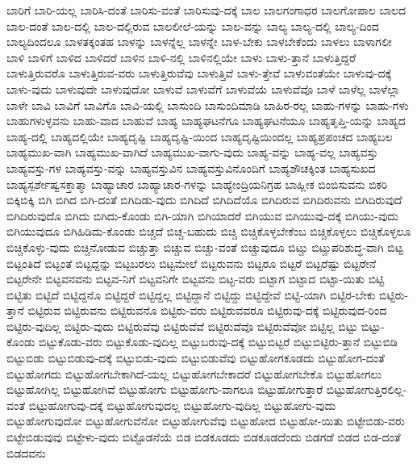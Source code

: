 {ಬಾರಿಗೆ
ಬಾರಿ-ಯಲ್ಲ
ಬಾರಿಸಿ-ದಂತೆ
ಬಾರಿಸು-ವಂತೆ
ಬಾರಿಸುವು-ದಕ್ಕೆ
ಬಾಲ
ಬಾಲಗಂಗಾಧರ
ಬಾಲಗೋಪಾಲ
ಬಾಲದ
ಬಾಲ-ದಂತೆ
ಬಾಲ-ದಲ್ಲಿ
ಬಾಲ-ದಲ್ಲಿರುವ
ಬಾಲಲೀಲೆ-ಯನ್ನು
ಬಾಲ-ವನ್ನು
ಬಾಲ್ಯ
ಬಾಲ್ಯ-ದಲ್ಲಿ
ಬಾಲ್ಯ-ದಿಂದ
ಬಾಲ್ಯದಿಂದಲೂ
ಬಾಳತಕ್ಕಂತಹ
ಬಾಳನ್ನು
ಬಾಳನ್ನೆಲ್ಲ
ಬಾಳನ್ನೇ
ಬಾಳ-ಬೇಕು
ಬಾಳಬೇಕೆಂದು
ಬಾಳಲು
ಬಾಳಾಗಲೀ
ಬಾಳಿ
ಬಾಳಿಗೆ
ಬಾಳಿದ
ಬಾಳಿದರೆ
ಬಾಳಿನ
ಬಾಳಿ-ನಲ್ಲಿ
ಬಾಳಿನಲ್ಲಿಯೇ
ಬಾಳು
ಬಾಳು-ತ್ತಾನೆ
ಬಾಳುತ್ತಿದ್ದರೆ
ಬಾಳುತ್ತಿರುವರೊ
ಬಾಳುತ್ತಿರುವ-ವರು
ಬಾಳುತ್ತಿರುವೆವು
ಬಾಳುತ್ತಿವೆ
ಬಾಳು-ತ್ತೇವೆ
ಬಾಳುವಂತೆಯೇ
ಬಾಳುವು-ದಕ್ಕೆ
ಬಾಳು-ವುದು
ಬಾಳುವುದೇ
ಬಾಳುವುದೋ
ಬಾಳುವೆ
ಬಾಳುವೆಗೆ
ಬಾಳುವೆಯೆ
ಬಾಳುವೆವೊ
ಬಾಳೆ
ಬಾಳೆಲ್ಲ
ಬಾಳೆಲ್ಲಾ
ಬಾಳೇ
ಬಾವಿ
ಬಾವಿಗೆ
ಬಾವಿಗೊ
ಬಾವಿ-ಯಲ್ಲಿ
ಬಾಸುಂದಿ
ಬಾಸುಂದಿಮಾಡಿ
ಬಾಹಿರ-ರಲ್ಲ
ಬಾಹು-ಗಳನ್ನು
ಬಾಹು-ಗಳು
ಬಾಹುಗಳುಳ್ಳವನು
ಬಾಹು-ವಾದ
ಬಾಹುವೆ
ಬಾಹ್ಯ
ಬಾಹ್ಯಘಟನೆಗೂ
ಬಾಹ್ಯಘಟನೆಯೂ
ಬಾಹ್ಯತೃಪ್ತಿ-ಯನ್ನು
ಬಾಹ್ಯದ
ಬಾಹ್ಯ-ದಲ್ಲಿ
ಬಾಹ್ಯದಲ್ಲಿಯೇ
ಬಾಹ್ಯದೃಷ್ಟಿ
ಬಾಹ್ಯದೃಷ್ಟಿ-ಯಿಂದ
ಬಾಹ್ಯದೃಷ್ಟಿಯಿಂದಲ್ಲ
ಬಾಹ್ಯಪ್ರಪಂಚದ
ಬಾಹ್ಯಬಲ
ಬಾಹ್ಯಮುಖ-ವಾಗಿ
ಬಾಹ್ಯಮುಖ-ವಾಗಿದೆ
ಬಾಹ್ಯಮುಖ-ವಾಗು-ವುದು
ಬಾಹ್ಯ-ವನ್ನು
ಬಾಹ್ಯ-ವಲ್ಲ
ಬಾಹ್ಯವಸ್ತು
ಬಾಹ್ಯವಸ್ತು-ಗಳ
ಬಾಹ್ಯವಸ್ತು-ವನ್ನು
ಬಾಹ್ಯವಸ್ತುವಿನ
ಬಾಹ್ಯವಸ್ತುವಿನೊಂದಿಗೆ
ಬಾಹ್ಯಶೌಚಕ್ಕಿಂತ
ಬಾಹ್ಯಸುಖದ
ಬಾಹ್ಯಸ್ಪರ್ಶೇಷ್ವಸಕ್ತಾತ್ಮಾ
ಬಾಹ್ಯಾಚಾರ
ಬಾಹ್ಯಾಚಾರ-ಗಳನ್ನು
ಬಾಹ್ಯೇಂದ್ರಿಯನಿಗ್ರಹ
ಬಾಹ್ಲೀಕ
ಬಿಂಬಿಸುವನು
ಬಿಕರಿ
ಬಿಕ್ಕಿಬಿಕ್ಕಿ
ಬಿಗಿ
ಬಿಗಿದ
ಬಿಗಿ-ದಂತೆ
ಬಿಗಿದಿಡು-ವುದು
ಬಿಗಿದಿದೆ
ಬಿಗಿದಿದೆಯೊ
ಬಿಗಿದಿರುವ
ಬಿಗಿದಿರುವನು
ಬಿಗಿದಿರುವುದೆ
ಬಿಗಿದಿರುವುದೊ
ಬಿಗಿದು
ಬಿಗಿದು-ಕೊಂಡು
ಬಿಗಿ-ಯಾಗಿ
ಬಿಗಿಯಾದರೆ
ಬಿಗಿಯುವ
ಬಿಗಿಯುವು-ದಕ್ಕೆ
ಬಿಗಿಯು-ವುದು
ಬಿಗಿಯುವುದೂ
ಬಿಗಿಹಿಡಿದು-ಕೊಂಡು
ಬಿಚ್ಚದೆ
ಬಿಚ್ಚ-ಬಹುದು
ಬಿಚ್ಚಿ
ಬಿಚ್ಚಿಕೊಳ್ಳಬೇಕೆಂಬ
ಬಿಚ್ಚಿಕೊಳ್ಳಲು
ಬಿಚ್ಚಿಕೊಳ್ಳಲೂ
ಬಿಚ್ಚಿಕೊಳ್ಳು-ವುದು
ಬಿಚ್ಚಿನೋಡುವ
ಬಿಚ್ಚುತ್ತಾ
ಬಿಚ್ಚುವ
ಬಿಚ್ಚು-ವಂತೆ
ಬಿಚ್ಚುವುದೂ
ಬಿಟ್ಚು
ಬಿಟ್ಚುಪರಿಶುದ್ಧ-ವಾಗಿ
ಬಿಟ್ಟ
ಬಿಟ್ಟಂತಿದೆ
ಬಿಟ್ಟಂತೆ
ಬಿಟ್ಟದ್ದನ್ನು
ಬಿಟ್ಟಬರಲು
ಬಿಟ್ಟಮೇಲೆ
ಬಿಟ್ಟರುವನು
ಬಿಟ್ಟರೂ
ಬಿಟ್ಟರೆ
ಬಿಟ್ಟರೆಷ್ಟು
ಬಿಟ್ಟರೇನೆ
ಬಿಟ್ಟರೇನೇ
ಬಿಟ್ಟವನವನು
ಬಿಟ್ಟವ-ನಿಗೆ
ಬಿಟ್ಟವನಿಗೇ
ಬಿಟ್ಟವನು
ಬಿಟ್ಟ-ವರು
ಬಿಟ್ಟಾಗ
ಬಿಟ್ಟಾದ
ಬಿಟ್ಟಾ-ಯಿತು
ಬಿಟ್ಟಿ
ಬಿಟ್ಟಿತು
ಬಿಟ್ಟಿದೆ
ಬಿಟ್ಟಿದ್ದನೊ
ಬಿಟ್ಟಿದ್ದರೆ
ಬಿಟ್ಟಿದ್ದಲ್ಲ
ಬಿಟ್ಟಿದ್ದಾನೆ
ಬಿಟ್ಟಿದ್ದು
ಬಿಟ್ಟಿದ್ದೇವೆ
ಬಿಟ್ಟಿ-ಯಾಗಿ
ಬಿಟ್ಟಿರ-ಬೇಕು
ಬಿಟ್ಟಿರು-ತ್ತಾನೆ
ಬಿಟ್ಟಿರುವ
ಬಿಟ್ಟಿರುವನು
ಬಿಟ್ಟಿರುವನೊ
ಬಿಟ್ಟಿರು-ವರು
ಬಿಟ್ಟಿರುವವರೂ
ಬಿಟ್ಟಿರುವು-ದಕ್ಕೆ
ಬಿಟ್ಟಿರುವುದ-ರಿಂದ
ಬಿಟ್ಟಿರು-ವುದಿಲ್ಲ
ಬಿಟ್ಟಿರು-ವುದು
ಬಿಟ್ಟಿರುವೆವು
ಬಿಟ್ಟಿರುವೆವೆ
ಬಿಟ್ಟಿರುವೆವೊ
ಬಿಟ್ಟಿರುವೆವೋ
ಬಿಟ್ಟಿಲ್ಲ
ಬಿಟ್ಟು
ಬಿಟ್ಟು-ಕೊಂಡು
ಬಿಟ್ಟುಕೊಡು-ವರು
ಬಿಟ್ಟುಕೊಡು-ವುದಿಲ್ಲ
ಬಿಟ್ಟುಬರುವು-ದಕ್ಕೆ
ಬಿಟ್ಟುಬಿಟ್ಟರೆ
ಬಿಟ್ಟುಬಿಟ್ಟಿರು-ತ್ತಾನೆ
ಬಿಟ್ಟುಬಿಡಿ
ಬಿಟ್ಟುಬಿಡು
ಬಿಟ್ಟುಬಿಡುವು-ದಕ್ಕೆ
ಬಿಟ್ಟುಬಿಡು-ವುದು
ಬಿಟ್ಟುಬಿಡುವೆವು
ಬಿಟ್ಟುಹೋಗಕೂಡದು
ಬಿಟ್ಟುಹೋಗ-ದಂತೆ
ಬಿಟ್ಟುಹೋಗದು
ಬಿಟ್ಟುಹೋಗಬೇಕಾಗಿದೆ-ಯಲ್ಲ
ಬಿಟ್ಟುಹೋಗಬೇಕಾದರೆ
ಬಿಟ್ಟುಹೋಗಬೇಕೊ
ಬಿಟ್ಟುಹೋಗಲು
ಬಿಟ್ಟುಹೋಗಿಲ್ಲ
ಬಿಟ್ಟುಹೋಗಿವೆ
ಬಿಟ್ಟುಹೋಗು
ಬಿಟ್ಟುಹೋಗು-ವಾಗಲೂ
ಬಿಟ್ಟುಹೋಗುತ್ತಾರೆ
ಬಿಟ್ಟುಹೋಗುತ್ತಿರಲಿಲ್ಲ-ವಂತೆ
ಬಿಟ್ಟುಹೋಗುವು-ದಕ್ಕೆ
ಬಿಟ್ಟುಹೋಗುವುದಲ್ಲ
ಬಿಟ್ಟುಹೋಗು-ವುದಿಲ್ಲ
ಬಿಟ್ಟುಹೋಗು-ವುದು
ಬಿಟ್ಟುಹೋಗುವುದೋ
ಬಿಟ್ಟುಹೋಗುವೆನೋ
ಬಿಟ್ಟುಹೋಗುವೆವು
ಬಿಟ್ಟುಹೋದ
ಬಿಟ್ಟುಹೋ-ಯಿತು
ಬಿಟ್ಟೇಬಿಡು-ವರು
ಬಿಟ್ಟೇಬಿಡುವುವು
ಬಿಟ್ಟೇಳು-ವುದು
ಬಿಟ್ಟೊಡನೆಯೆ
ಬಿಡ
ಬಿಡಕೂಡದು
ಬಿಡಕೂಡದೆಂದು
ಬಿಡಗಡೆ
ಬಿಡದ
ಬಿಡ-ದಂತೆ
ಬಿಡದವನು
}
